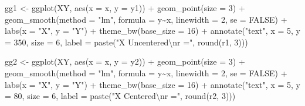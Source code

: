 \documentclass[
  letterpaper,
  10pt,
  krantz2]{krantz}
\makeatletter
\newenvironment{Shaded}{\begin{snugshade}}{\end{snugshade}}
\newcommand{\AttributeTok}[1]{\textcolor[rgb]{0.40,0.45,0.13}{#1}}
\newcommand{\ConstantTok}[1]{\textcolor[rgb]{0.56,0.35,0.01}{#1}}
\newcommand{\DecValTok}[1]{\textcolor[rgb]{0.68,0.00,0.00}{#1}}
\newcommand{\FunctionTok}[1]{\textcolor[rgb]{0.28,0.35,0.67}{#1}}
\newcommand{\NormalTok}[1]{\textcolor[rgb]{0.00,0.23,0.31}{#1}}
\newcommand{\OtherTok}[1]{\textcolor[rgb]{0.00,0.23,0.31}{#1}}
\newcommand{\SpecialCharTok}[1]{\textcolor[rgb]{0.37,0.37,0.37}{#1}}
\newcommand{\StringTok}[1]{\textcolor[rgb]{0.13,0.47,0.30}{#1}}
\newenvironment{kframe}{%
  \medskip{}
  \setlength{\fboxsep}{.8em}
  \def\at@end@of@kframe{}%
  \ifinner\ifhmode%
  \def\at@end@of@kframe{\end{minipage}}%
  \begin{minipage}{\columnwidth}%
  \fi\fi%
  \def\FrameCommand##1{\hskip\@totalleftmargin \hskip-\fboxsep
  \colorbox{shadecolor}{##1}\hskip-\fboxsep
      \hskip-\linewidth \hskip-\@totalleftmargin \hskip\columnwidth}%
  \MakeFramed {\advance\hsize-\width
    \@totalleftmargin\z@ \linewidth\hsize
    \@setminipage}}%
{\par\unskip\endMakeFramed%
  \at@end@of@kframe}
\renewenvironment{Shaded}{\begin{kframe}}{\end{kframe}}
\makeatother
\begin{document}
{\begin{Shaded}
\begin{Highlighting}[]
\NormalTok{gg1 }\OtherTok{\textless{}{-}}
\FunctionTok{ggplot}\NormalTok{(XY, }\FunctionTok{aes}\NormalTok{(}\AttributeTok{x =}\NormalTok{ x, }\AttributeTok{y =}\NormalTok{ y1)) }\SpecialCharTok{+}
  \FunctionTok{geom\_point}\NormalTok{(}\AttributeTok{size =} \DecValTok{3}\NormalTok{) }\SpecialCharTok{+}
  \FunctionTok{geom\_smooth}\NormalTok{(}\AttributeTok{method =} \StringTok{"lm"}\NormalTok{, }\AttributeTok{formula =}\NormalTok{ y}\SpecialCharTok{\textasciitilde{}}\NormalTok{x, }\AttributeTok{linewidth =} \DecValTok{2}\NormalTok{, }\AttributeTok{se =} \ConstantTok{FALSE}\NormalTok{) }\SpecialCharTok{+}
  \FunctionTok{labs}\NormalTok{(}\AttributeTok{x =} \StringTok{"X"}\NormalTok{, }\AttributeTok{y =} \StringTok{"Y"}\NormalTok{) }\SpecialCharTok{+}
  \FunctionTok{theme\_bw}\NormalTok{(}\AttributeTok{base\_size =} \DecValTok{16}\NormalTok{) }\SpecialCharTok{+}
  \FunctionTok{annotate}\NormalTok{(}\StringTok{"text"}\NormalTok{, }\AttributeTok{x =} \DecValTok{5}\NormalTok{, }\AttributeTok{y =} \DecValTok{350}\NormalTok{, }\AttributeTok{size =} \DecValTok{6}\NormalTok{,}
           \AttributeTok{label =} \FunctionTok{paste}\NormalTok{(}\StringTok{"X Uncentered}\SpecialCharTok{\textbackslash{}n}\StringTok{r ="}\NormalTok{, }\FunctionTok{round}\NormalTok{(r1, }\DecValTok{3}\NormalTok{)))}

\NormalTok{gg2 }\OtherTok{\textless{}{-}}
  \FunctionTok{ggplot}\NormalTok{(XY, }\FunctionTok{aes}\NormalTok{(}\AttributeTok{x =}\NormalTok{ x, }\AttributeTok{y =}\NormalTok{ y2)) }\SpecialCharTok{+}
  \FunctionTok{geom\_point}\NormalTok{(}\AttributeTok{size =} \DecValTok{3}\NormalTok{) }\SpecialCharTok{+}
  \FunctionTok{geom\_smooth}\NormalTok{(}\AttributeTok{method =} \StringTok{"lm"}\NormalTok{, }\AttributeTok{formula =}\NormalTok{ y}\SpecialCharTok{\textasciitilde{}}\NormalTok{x, }\AttributeTok{linewidth =} \DecValTok{2}\NormalTok{, }\AttributeTok{se =} \ConstantTok{FALSE}\NormalTok{) }\SpecialCharTok{+}
  \FunctionTok{labs}\NormalTok{(}\AttributeTok{x =} \StringTok{"X"}\NormalTok{, }\AttributeTok{y =} \StringTok{"Y"}\NormalTok{) }\SpecialCharTok{+}
  \FunctionTok{theme\_bw}\NormalTok{(}\AttributeTok{base\_size =} \DecValTok{16}\NormalTok{) }\SpecialCharTok{+}
  \FunctionTok{annotate}\NormalTok{(}\StringTok{"text"}\NormalTok{, }\AttributeTok{x =} \DecValTok{5}\NormalTok{, }\AttributeTok{y =} \DecValTok{80}\NormalTok{, }\AttributeTok{size =} \DecValTok{6}\NormalTok{,}
           \AttributeTok{label =} \FunctionTok{paste}\NormalTok{(}\StringTok{"X Centered}\SpecialCharTok{\textbackslash{}n}\StringTok{r ="}\NormalTok{, }\FunctionTok{round}\NormalTok{(r2, }\DecValTok{3}\NormalTok{)))}


\end{Highlighting}
\end{Shaded}}
\end{document}
